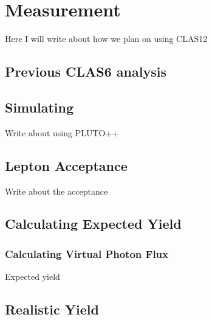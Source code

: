 \section{Measurement}\label{sec:measurement}
Here I will write about how we plan on using CLAS12
\subsection{Previous CLAS6 analysis}
\subsection{Simulating}
Write about using PLUTO++
\subsection{Lepton Acceptance}
Write about the acceptance
\subsection{Calculating Expected Yield}
\subsubsection{Calculating Virtual Photon Flux}
Expected yield
\subsection{Realistic Yield}
